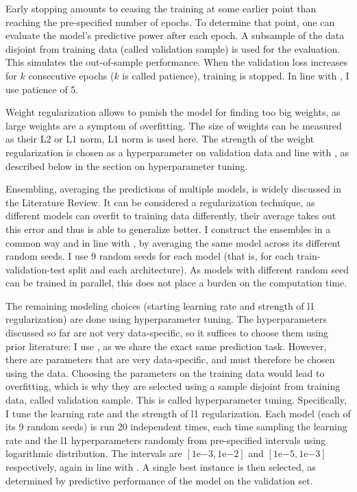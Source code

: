 	Early stopping amounts to ceasing the training at some earlier point than reaching the pre-specified number of epochs. To determine that point, one can evaluate the model's predictive power after each epoch. A subsample of the data disjoint from training data (called validation sample) is used for the evaluation. This simulates the out-of-sample performance. When the validation loss increases for $k$ consecutive epochs ($k$ is called patience), training is stopped. In line with \cite{gu2020empirical}, I use patience of 5. 
	
	Weight regularization allows to punish the model for finding too big weights, as large weights are a symptom of overfitting. The size of weights can be measured as their L2 or L1 norm, L1 norm is used here. The strength of the weight regularization is chosen as a hyperparameter on validation data and line with \cite{gu2020empirical}, as described below in the section on hyperparameter tuning.
	
	Ensembling, averaging the predictions of multiple models, is widely discussed in the Literature Review. It can be considered a regularization technique, as different models can overfit to training data differently, their average takes out this error and thus is able to generalize better. I construct the ensembles in a common way and in line with \cite{gu2020empirical}, by averaging the same model across its different random seeds. I use 9 random seeds for each model (that is, for each train-validation-test split and each architecture). As models with different random seed can be trained in parallel, this does not place a burden on the computation time.
		
	The remaining modeling choices (starting learning rate and strength of l1 regularization) are done using hyperparameter tuning. The hyperparameters discussed so far are not very data-specific, so it suffices to choose them using prior literature: I use \cite{gu2020empirical}, as we share the exact same prediction task. However, there are parameters that are very data-specific, and must therefore be chosen using the data. Choosing the parameters on the training data would lead to overfitting, which is why they are selected using a sample disjoint from training data, called validation sample. This is called hyperparameter tuning. Specifically, I tune the learning rate and the strength of l1 regularization. Each model (each of its 9 random seeds) is run 20 independent times, each time sampling the learning rate and the l1 hyperparameters randomly from pre-specified intervals using logarithmic distribution. The intervals are $\left[1\mathrm{e}{-3}, 1\mathrm{e}{-2}\right]$ and $\left[1\mathrm{e}{-5}, 1\mathrm{e}{-3}\right]$ respectively, again in line with \cite{gu2020empirical}. A single best instance is then selected, as determined by predictive performance of the model on the validation set.
	
